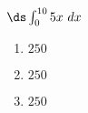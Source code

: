 {$\ds \int_{0}^{10} 5x\ dx$}
{\begin{enumerate}
\item		$250$
\item		$250$
\item		$250$
\end{enumerate}
}